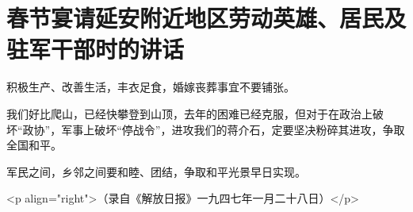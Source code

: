 \section[春节宴请延安附近地区劳动英雄、居民及驻军干部时的讲话（一九四七年一月二十四日）]{春节宴请延安附近地区劳动英雄、居民及驻军干部时的讲话}


积极生产、改善生活，丰衣足食，婚嫁丧葬事宜不要铺张。

我们好比爬山，已经快攀登到山顶，去年的困难已经克服，但对于在政治上破坏“政协”，军事上破坏“停战令”，进攻我们的蒋介石，定要坚决粉碎其进攻，争取全国和平。

军民之间，乡邻之间要和睦、团结，争取和平光景早日实现。

<p align="right">（录自《解放日报》一九四七年一月二十八日）</p>


